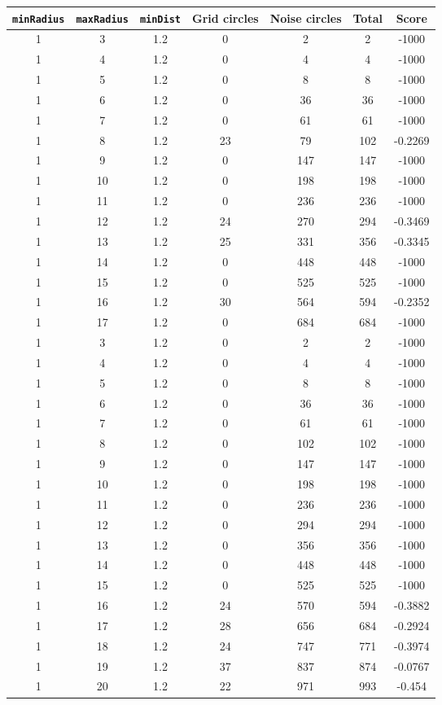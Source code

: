 \documentclass[letterpaper, 12pt]{article}
\begin{document}
\begin{longtable}{|c|c|c|c|c|c|c|}
\hline
\textbf{\texttt{minRadius}} & \textbf{\texttt{maxRadius}} & \textbf{\texttt{minDist}} & \textbf{Grid circles} & \textbf{Noise circles} & \textbf{Total} & \textbf{Score} \\
\hline
1 & 3 & 1.2 & 0 & 2 & 2 & -1000 \\
\hline
1 & 4 & 1.2 & 0 & 4 & 4 & -1000 \\
\hline
1 & 5 & 1.2 & 0 & 8 & 8 & -1000 \\
\hline
1 & 6 & 1.2 & 0 & 36 & 36 & -1000 \\
\hline
1 & 7 & 1.2 & 0 & 61 & 61 & -1000 \\
\hline
1 & 8 & 1.2 & 23 & 79 & 102 & -0.2269 \\
\hline
1 & 9 & 1.2 & 0 & 147 & 147 & -1000 \\
\hline
1 & 10 & 1.2 & 0 & 198 & 198 & -1000 \\
\hline
1 & 11 & 1.2 & 0 & 236 & 236 & -1000 \\
\hline
1 & 12 & 1.2 & 24 & 270 & 294 & -0.3469 \\
\hline
1 & 13 & 1.2 & 25 & 331 & 356 & -0.3345 \\
\hline
1 & 14 & 1.2 & 0 & 448 & 448 & -1000 \\
\hline
1 & 15 & 1.2 & 0 & 525 & 525 & -1000 \\
\hline
1 & 16 & 1.2 & 30 & 564 & 594 & -0.2352 \\
\hline
1 & 17 & 1.2 & 0 & 684 & 684 & -1000 \\
\hline
1 & 3 & 1.2 & 0 & 2 & 2 & -1000 \\
\hline
1 & 4 & 1.2 & 0 & 4 & 4 & -1000 \\
\hline
1 & 5 & 1.2 & 0 & 8 & 8 & -1000 \\
\hline
1 & 6 & 1.2 & 0 & 36 & 36 & -1000 \\
\hline
1 & 7 & 1.2 & 0 & 61 & 61 & -1000 \\
\hline
1 & 8 & 1.2 & 0 & 102 & 102 & -1000 \\
\hline
1 & 9 & 1.2 & 0 & 147 & 147 & -1000 \\
\hline
1 & 10 & 1.2 & 0 & 198 & 198 & -1000 \\
\hline
1 & 11 & 1.2 & 0 & 236 & 236 & -1000 \\
\hline
1 & 12 & 1.2 & 0 & 294 & 294 & -1000 \\
\hline
1 & 13 & 1.2 & 0 & 356 & 356 & -1000 \\
\hline
1 & 14 & 1.2 & 0 & 448 & 448 & -1000 \\
\hline
1 & 15 & 1.2 & 0 & 525 & 525 & -1000 \\
\hline
1 & 16 & 1.2 & 24 & 570 & 594 & -0.3882 \\
\hline
1 & 17 & 1.2 & 28 & 656 & 684 & -0.2924 \\
\hline
1 & 18 & 1.2 & 24 & 747 & 771 & -0.3974 \\
\hline
1 & 19 & 1.2 & 37 & 837 & 874 & -0.0767 \\
\hline
1 & 20 & 1.2 & 22 & 971 & 993 & -0.454 \\
\hline
\end{longtable}
\end{document}
